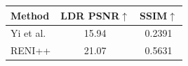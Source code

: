 \begin{tabular}{l|cc}
\hline
Method & LDR PSNR$\uparrow$ & SSIM$\uparrow$ \\
\hline
Yi et al. & 15.94 & 0.2391 \\
RENI++ & 21.07 & 0.5631 \\
\hline
\end{tabular}